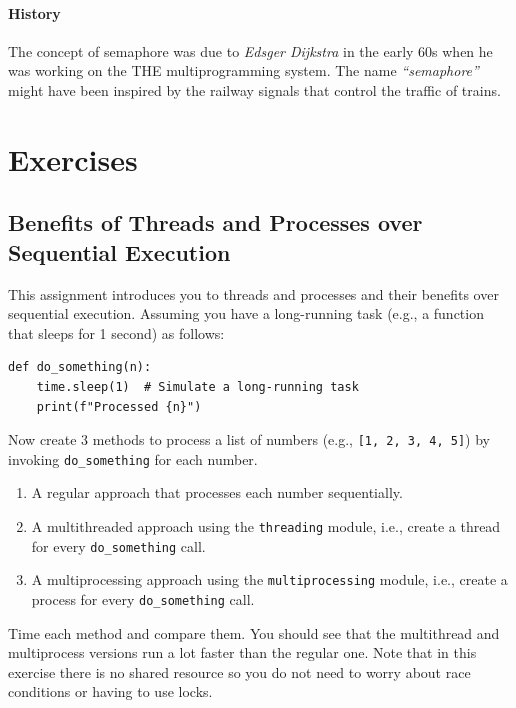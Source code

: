 \documentclass[oneside,11pt,dvipsnames]{book}
\newcommand{\code}[1]{\texttt{#1}}
\begin{document}
\paragraph{History} The concept of semaphore was due to \emph{Edsger Dijkstra} in the early 60s when he was working on the THE multiprogramming system. The name \emph{``semaphore''} might have been inspired by the railway signals that control the traffic of trains.





\section{Exercises}

\subsection{Benefits of Threads and Processes over Sequential Execution}\label{exercise:threads-and-processes-vs-sequential}

This assignment introduces you to threads and processes and their benefits over sequential execution.  Assuming you have a long-running task (e.g., a function that sleeps for 1 second) as follows: 

\begin{lstlisting}
def do_something(n):
    time.sleep(1)  # Simulate a long-running task
    print(f"Processed {n}")
\end{lstlisting}

Now create 3 methods to process a list of numbers (e.g., \code{[1, 2, 3, 4, 5]}) by invoking \code{do\_something} for each number. 
\begin{enumerate}
    \item A regular approach that processes each number sequentially.
    \item A multithreaded approach using the \code{threading} module, i.e., create a thread for every \code{do\_something} call.
    \item A multiprocessing approach using the \code{multiprocessing} module, i.e., create a process for every \code{do\_something} call.
\end{enumerate}
Time each method and compare them. You should see that the multithread and multiprocess versions run a lot faster than the regular one.
Note that in this exercise there is no shared resource so you do not need to worry about race conditions or having to use locks. 
\end{document}
